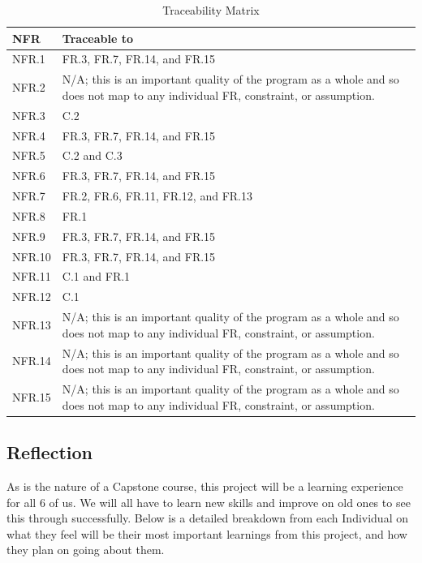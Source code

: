 \documentclass[12pt]{article}
\begin{document}
\begin{table}[H]
\caption{Traceability Matrix} \label{TblTraceabilityMatrix}
\begin{tabular}{p{}|p{}|}
\toprule
\textbf{NFR} & \textbf{Traceable to}\\
\midrule
NFR.1 & FR.3, FR.7, FR.14, and FR.15\\
\midrule
NFR.2 & N/A; this is an important quality of the program as a whole and so does not map to any individual FR, constraint, or assumption.\\
\midrule
NFR.3 & C.2\\
\midrule
NFR.4 & FR.3, FR.7, FR.14, and FR.15\\
\midrule
NFR.5 & C.2 and C.3\\
\midrule
NFR.6 & FR.3, FR.7, FR.14, and FR.15\\
\midrule
NFR.7 & FR.2, FR.6, FR.11, FR.12, and FR.13\\
\midrule
NFR.8 & FR.1\\
\midrule
NFR.9 & FR.3, FR.7, FR.14, and FR.15\\
\midrule
NFR.10 & FR.3, FR.7, FR.14, and FR.15\\
\midrule
NFR.11 & C.1 and FR.1\\
\midrule
NFR.12 & C.1\\
\midrule
NFR.13 & N/A; this is an important quality of the program as a whole and so does not map to any individual FR, constraint, or assumption.\\
\midrule
NFR.14 & N/A; this is an important quality of the program as a whole and so does not map to any individual FR, constraint, or assumption.\\
\midrule
NFR.15 & N/A; this is an important quality of the program as a whole and so does not map to any individual FR, constraint, or assumption.\\
\bottomrule
\end{tabular}
\end{table}

\subsection{Reflection}

As is the nature of a Capstone course, this project will be a learning experience for all 6 of us. We will all have to learn new skills and improve on old ones to see this 
through successfully. Below is a detailed breakdown from each Individual on what they feel will be their most important learnings from this project, and how they plan on
going about them.
\end{document}
